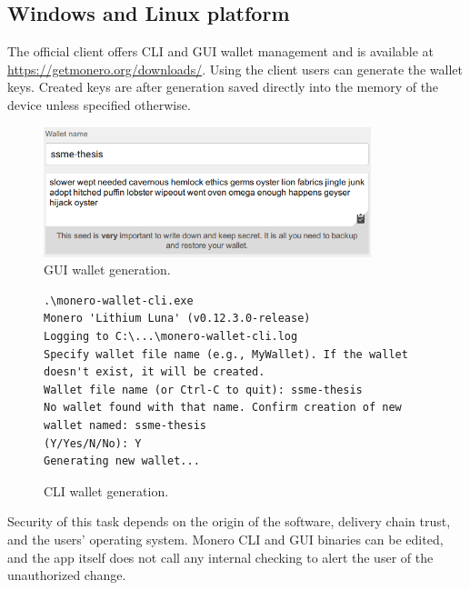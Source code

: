 \documentclass[
  printed, %
  table,   %
  nolof,     %
  nolot,     %
           oneside, color
]{fithesis3}
\begin{document}
\subsection{Windows and Linux platform}
The official client offers CLI and GUI wallet management and is available at \url{https://getmonero.org/downloads/}. Using the client users can generate the wallet keys. Created keys are after generation saved directly into the memory of the device unless specified otherwise. 
\begin{figure}[H]
\begin{center}
 \includegraphics[trim={0 0 0 0},clip,width=0.85\textwidth]{Screenshot_4.png}
    \caption{GUI wallet generation.}
    \label{pic:guigenerator}
\end{center}
    \end{figure}

\begin{figure}[H]
\begin{center}
\begin{lstlisting}
.\monero-wallet-cli.exe
Monero 'Lithium Luna' (v0.12.3.0-release)
Logging to C:\...\monero-wallet-cli.log
Specify wallet file name (e.g., MyWallet). If the wallet 
doesn't exist, it will be created.
Wallet file name (or Ctrl-C to quit): ssme-thesis
No wallet found with that name. Confirm creation of new 
wallet named: ssme-thesis
(Y/Yes/N/No): Y
Generating new wallet...
\end{lstlisting}
\caption{CLI wallet generation.}
    \label{pic:cligenerator}
\end{center}
    \end{figure}
Security of this task depends on the origin of the software, delivery chain trust, and the users' operating system. Monero CLI and GUI binaries can be edited, and the app itself does not call any internal checking to alert the user of the unauthorized change. 
\end{document}
